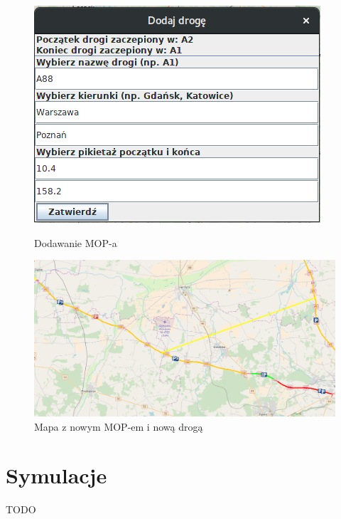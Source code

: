 \documentclass[10pt,paper=a4 BCOR0, DIV15, titlepage=false, oneside]{scrbook} %
\begin{document}
     \begin{figure}[ht]
       \begin{minipage}{.3\textwidth}
        \centering
       \includegraphics[width=.9\linewidth]{dodawanie_drogi.png}
        \caption{Dodawanie MOP-a}
      \end{minipage}%
      \begin{minipage}{.6\textwidth}
        \centering
       \includegraphics[width=.9\linewidth]{dodany_mop_droga.png}
        \caption{Mapa z nowym MOP-em i nową drogą}
      \end{minipage}
      \end{figure}


    \chapter*{Symulacje}
    \addtocounter{chapter}{1}
    \setcounter{section}{0}
    TODO

  
\end{document}

